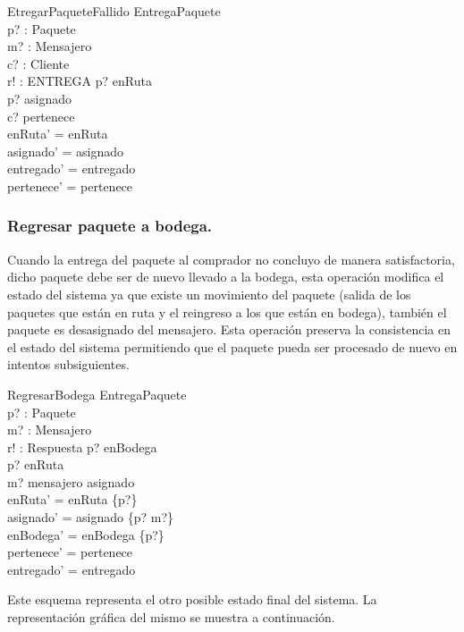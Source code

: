 \documentclass[12pt,a4paper]{article}
\begin{document}
\begin{enumerate}
\begin{schema}{EtregarPaqueteFallido}
\Xi EntregaPaquete\\
p? : Paquete\\
m? : Mensajero\\
c? : Cliente\\
r! : ENTREGA
\where
p? \in  enRuta\\
p? \in \dom asignado\\
c? \in \ran pertenece\\
enRuta' = enRuta\\
asignado' = asignado\\
entregado' = entregado\\
pertenece' = pertenece
\end{schema}

\end{enumerate}


\subsubsection{Regresar paquete a bodega.}
Cuando la entrega del paquete al comprador no concluyo de manera satisfactoria, dicho paquete debe ser de nuevo llevado a la bodega, esta operación modifica el estado del sistema ya que existe un movimiento del paquete (salida de los paquetes que están en ruta y el reingreso a los que están en bodega), también el paquete es desasignado del mensajero. Esta operación preserva la consistencia en el estado del sistema permitiendo que el paquete pueda ser procesado de nuevo en intentos subsiguientes.

\begin{schema}{RegresarBodega}
\Delta EntregaPaquete\\
p? : Paquete\\
m? : Mensajero\\
r! : Respuesta
\where
p? \notin enBodega\\
p? \in  enRuta\\
m? \in mensajero \setminus \ran asignado\\
enRuta' = enRuta \setminus \{p?\}\\
asignado' = asignado \setminus \{p? \mapsto m?\}\\
enBodega' = enBodega \cup \{p?\}\\
pertenece' = pertenece\\
entregado' = entregado
\end{schema}

Este esquema representa el otro posible estado final del sistema. La representación gráfica del mismo se muestra a continuación. 
\end{document}

